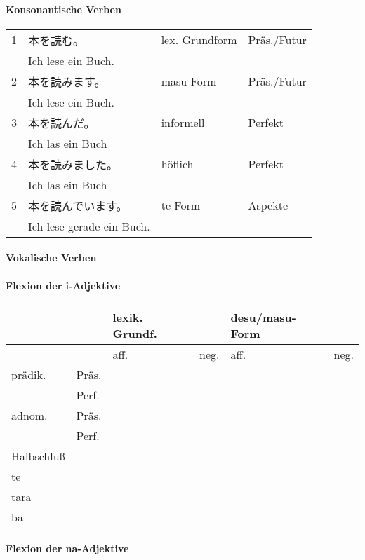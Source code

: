 \documentclass[justified, a4paper, notitlepage, captions=tableheading, nobib]{tufte-handout}
\begin{document}
\paragraph{Konsonantische Verben}
\label{sec:orgedb8762}

\begin{tabular}{rlll}
1 & 本を読む。 & lex. Grundform & Präs./Futur\\
 & Ich lese ein Buch. &  & \\
2 & 本を読みます。 & masu-Form & Präs./Futur\\
 & Ich lese ein Buch. &  & \\
3 & 本を読んだ。 & informell & Perfekt\\
 & Ich las ein Buch &  & \\
4 & 本を読みました。 & höflich & Perfekt\\
 & Ich las ein Buch &  & \\
5 & 本を読んでいます。 & te-Form & Aspekte\\
 & Ich lese gerade ein Buch. &  & \\
\end{tabular}

\paragraph{Vokalische Verben}
\label{sec:org00ae28c}

\paragraph{Flexion der i-Adjektive}
\label{sec:orgc3718ca}

\begin{tabular}{llllll}
 &  & lexik. Grundf. &  & desu/masu-Form & \\
\hline
 &  & aff. & neg. & aff. & neg.\\
\hline
prädik. & Präs. &  &  &  & \\
 & Perf. &  &  &  & \\
adnom. & Präs. &  &  &  & \\
 & Perf. &  &  &  & \\
Halbschluß &  &  &  &  & \\
te &  &  &  &  & \\
tara &  &  &  &  & \\
ba &  &  &  &  & \\
\end{tabular}

\paragraph{Flexion der na-Adjektive}
\label{sec:org79dfba8}
\end{document}
